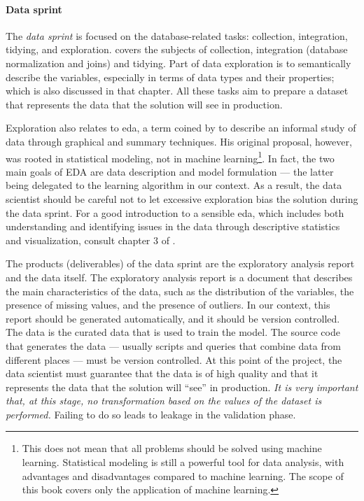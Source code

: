 \paragraph{Data sprint}
The \emph{data sprint} is focused on the database-related tasks: collection, integration, tidying, and
exploration.   covers the subjects of collection, integration (database
normalization and joins) and tidying.  Part of data exploration is to semantically describe
the variables, especially in terms of data types and their properties; which is also
discussed in that chapter.  All these tasks aim to prepare a dataset that represents
the data that the solution will see in production.

Exploration also relates to \gls{eda}, a term coined by
\textcite{Tukey1977} to describe an informal study of data through graphical and summary
techniques.  His original proposal, however, was rooted in statistical modeling, not in
machine learning\footnote{This does not mean that all problems should be solved using
machine learning.  Statistical modeling is still a powerful tool for data analysis, with
advantages and disadvantages compared to machine learning.  The scope of this book covers
only the application of machine learning.}.  In fact, the two main goals of EDA are data
description and model formulation --- the latter being delegated to
the learning algorithm in our context.  As a result, the data scientist should be careful
not to let excessive exploration bias the solution during the data sprint.
For a good introduction to a sensible \gls{eda}, which includes both understanding
and identifying issues in the data through descriptive statistics and visualization, consult chapter 3 of
\textcite{Zumel2019}.

The products (deliverables) of the data sprint are the exploratory analysis report and the
data itself.  The exploratory analysis report is a document that describes the main
characteristics of the data, such as the distribution of the variables, the presence of
missing values, and the presence of outliers.  In our context, this report should be
generated automatically, and it should be version controlled.  The data is the curated
data that is used to train the model.  The source code that generates the data ---
usually scripts and queries that combine data from different places --- must be version
controlled.  At this point of the project, the data scientist must guarantee that the data
is of high quality and that it represents the data that the solution will ``see'' in
production.  \emph{It is very important that, at this stage, no transformation based
on the values of the dataset is performed.}  Failing to do so leads to \gls{leakage} in
the validation phase.

